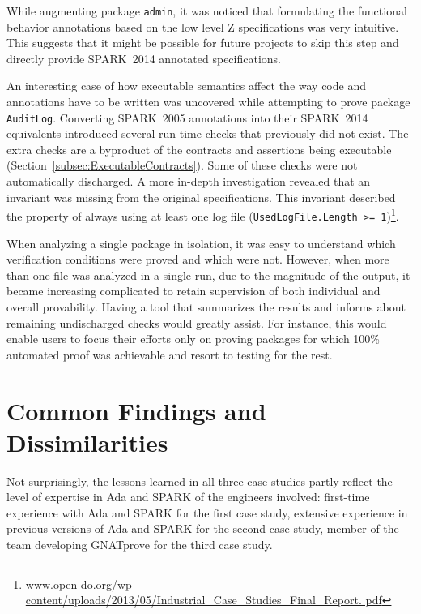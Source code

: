 \documentclass[10pt,a4paper,twocolumn]{article}
\newcommand{\gnatprove}{GNATprove\xspace}
\newcommand{\oldspark}{SPARK~2005\xspace}
\newcommand{\newspark}{SPARK~2014\xspace}
\newcommand{\etc}{\textit{etc.}\xspace}
\begin{document}
While augmenting package \verb|admin|, it was noticed that formulating
the functional behavior annotations based on the low level Z
specifications was very intuitive. This suggests that it might be
possible for future projects to skip this step and directly provide
\newspark annotated specifications.

An interesting case of how executable semantics affect the way code
and annotations have to be written was uncovered while attempting to
prove package \verb|AuditLog|. Converting \oldspark annotations into
their \newspark equivalents introduced several run-time checks that
previously did not exist. The extra checks are a byproduct of the
contracts and assertions being executable
(Section~\ref{subsec:ExecutableContracts}). Some of these checks were
not automatically discharged. A more in-depth investigation revealed
that an invariant was missing from the original specifications. This
invariant described the property of always using at least one log file
(\verb|UsedLogFile.Length >= 1|)\footnote{\url{
    www.open-do.org/wp-content/uploads/2013/05/Industrial_Case_Studies_Final_Report.
    pdf}}.

When analyzing a single package in isolation, it was easy to
understand which verification conditions were proved and which were
not. However, when more than one file was analyzed in a single run,
due to the magnitude of the output, it became increasing complicated
to retain supervision of both individual and overall
provability. Having a tool that summarizes the results and informs
about remaining undischarged checks would greatly assist. For
instance, this would enable users to focus their efforts only on
proving packages for which 100\% automated proof was achievable and
resort to testing for the rest.

\section{Common Findings and Dissimilarities}

Not surprisingly, the lessons learned in all three case studies partly
reflect the level of expertise in Ada and SPARK of the engineers
involved: first-time experience with Ada and SPARK for the first case
study, extensive experience in previous versions of Ada and SPARK for
the second case study, member of the team developing \gnatprove for
the third case study.
\end{document}
